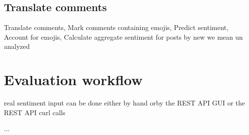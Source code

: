 \subsection*{Translate comments \label{sec:translate-comments}}
        Translate comments,{}
        Mark comments containing emojis, 
        Predict sentiment,
		Account for emojis, 
        Calculate aggregate sentiment for posts
by new we mean un analyzed



\section{Evaluation workflow\label{sec:sentiment-evaluation-workflow}}

real sentiment input can be done either by hand orby the REST API GUI or the REST API curl calls

...









